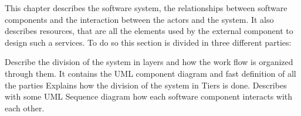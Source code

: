 This chapter describes the software system, the relationships between software components and the interaction between the actors and the system. It also describes resources, that are all the elements used by the external component to design such a services. To do so this section is divided in three different parties:
\begin{itemize}
	 Describe the division of the system in layers and how the work flow is organized through them. It contains the UML component diagram and fast definition of all the parties
	 Explains how the division of the system in Tiers is done.
	 Describes with some UML Sequence diagram how each software component interacts with each other. 
\end{itemize}

